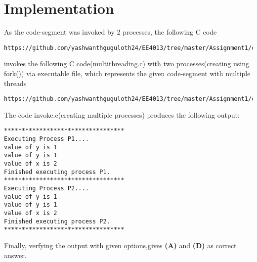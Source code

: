 \documentclass[journal,12pt,twocolumn]{IEEEtran}
\begin{document}
\section{Implementation}
As the code-segment was invoked by 2 processes, the following C code 
\newline
\begin{lstlisting}
https://github.com/yashwanthguguloth24/EE4013/tree/master/Assignment1/codes/invoke.c
\end{lstlisting}

invokes the following C code(multithreading.c) with two processes(creating using fork()) via executable file, which represents the given code-segment with multiple threads

\begin{lstlisting}
https://github.com/yashwanthguguloth24/EE4013/tree/master/Assignment1/codes/multithreading.c
\end{lstlisting}
\newline
The code invoke.c(creating multiple processes) produces the following output:
\begin{lstlisting}
**********************************
Executing Process P1.... 
value of y is 1
value of y is 1
value of x is 2
Finished executing process P1. 
**********************************
Executing Process P2.... 
value of y is 1
value of y is 1
value of x is 2
Finished executing process P2.
**********************************
\end{lstlisting}
\newline
Finally, verfying the output with given options,gives \textbf{(A)} and \textbf{(D)} as correct answer. 
\end{document}

